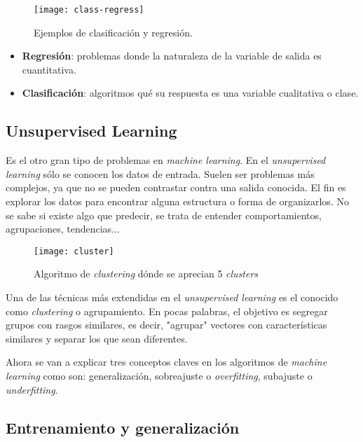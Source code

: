 \begin{figure}[h!]
	\centering
	\texttt{[image: class-regress]}
	\caption{Ejemplos de clasificación y regresión.}
	\label{fig:class_regress}
\end{figure}


\begin{itemize}
\item \textbf{Regresión}: problemas donde la naturaleza de la variable de salida es cuantitativa. 
\item \textbf{Clasificación}: algoritmos qué su respuesta es una variable cualitativa o clase.
\end{itemize}

\vspace{1cm}

\subsection{Unsupervised Learning}

Es el otro gran tipo de problemas en \textit{machine learning}. En el \textit{unsupervised learning} sólo se conocen los datos de entrada.\cite{ISL} Suelen ser problemas más complejos, ya que no se pueden contrastar contra una salida conocida. El fin es explorar los datos para encontrar alguna estructura o forma de organizarlos. \cite{cleverdata} No se sabe si existe algo que predecir, se trata de entender comportamientos, agrupaciones, tendencias... \par 

\begin{figure}[h]
	\centering
	\texttt{[image: cluster]}
	\caption{Algoritmo de \textit{clustering} dónde se aprecian 5 \textit{clusters}}
	\label{fig:cluster}
\end{figure}

Una de las técnicas más extendidas en el \textit{unsupervised learning} es el conocido como \textit{clustering} o agrupamiento. En pocas palabras, el objetivo es segregar grupos con rasgos similares, es decir, "agrupar" vectores con características similares y separar los que sean diferentes.\cite{clustering}

Ahora se van a explicar tres conceptos claves en los algoritmos de \textit{machine learning} como son: generalización, sobreajuste o \textit{overfitting}, subajuste o \textit{underfitting}.

\vspace{4cm}

\subsection{Entrenamiento y generalización}

